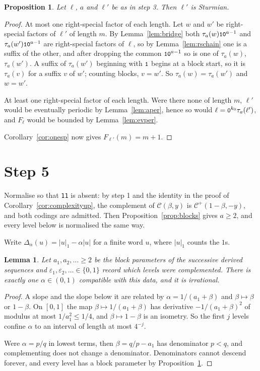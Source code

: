 \documentclass[11pt,a4paper]{article}
\newcommand{\seq}[1]{\texttt{\small #1}}
\newcommand{\C}{\mathcal{C}}
\newcommand{\Cp}{\mathcal{C}^{+}}
\theoremstyle{definition}
\theoremstyle{plain}
\newtheorem{lemma}[definition]{Lemma}
\newtheorem{proposition}[definition]{Proposition}
\begin{document}
\begin{proposition}\label{prop:derived}
Let $\ell$, $a$ and $\ell'$ be as in step 3. Then $\ell'$ is Sturmian.
\end{proposition}

\begin{proof}
At most one right-special factor of each length. Let $w$ and $w'$ be
right-special factors of $\ell'$ of length $m$. By Lemma~\ref{lem:bridge} both
$\tau_a(w)\seq{1}\seq{0}^{a-1}$ and $\tau_a(w')\seq{1}\seq{0}^{a-1}$ are
right-special factors of $\ell$, so by Lemma~\ref{lem:rschain} one is a suffix
of the other, and after dropping the common $\seq{1}\seq{0}^{a-1}$ so is one of
$\tau_a(w)$, $\tau_a(w')$. A suffix of $\tau_a(w')$ beginning with $\seq{1}$
begins at a block start, so it is $\tau_a(v)$ for a suffix $v$ of $w'$; counting
blocks, $v = w'$. So $\tau_a(w) = \tau_a(w')$ and $w = w'$.

At least one right-special factor of each length. Were there none of length $m$,
$\ell'$ would be eventually periodic by Lemma~\ref{lem:aper}, hence so would
$\ell = \seq{0}^{k_0}\tau_a(\ell')$, and $F_\ell$ would be bounded by
Lemma~\ref{lem:evper}.

Corollary~\ref{cor:onesp} now gives $F_{\ell'}(m) = m+1$.
\end{proof}

\section{Step 5}

Normalise so that \seq{11} is absent: by step 1 and the identity in the proof of
Corollary~\ref{cor:complexityup}, the complement of $\C(\beta,y)$ is
$\Cp(1-\beta,-y)$, and both codings are admitted. Then
Proposition~\ref{prop:blocks} gives $a \geq 2$, and every level below is
normalised the same way.

Write $\Delta_\alpha(u) = \lvert u\rvert_1 - \alpha\lvert u\rvert$ for a finite
word $u$, where $\lvert u \rvert_1$ counts the $1$s.

\begin{lemma}\label{lem:slope}
Let $a_1, a_2, \ldots \geq 2$ be the block parameters of the successive derived
sequences and $\varepsilon_1, \varepsilon_2, \ldots \in \{0,1\}$ record which
levels were complemented. There is exactly one $\alpha \in (0,1)$ compatible
with this data, and it is irrational.
\end{lemma}

\begin{proof}
A slope and the slope below it are related by $\alpha = 1/(a_1 + \beta)$ and
$\beta \mapsto \beta$ or $1-\beta$. On $[0,1]$ the map $\beta \mapsto
1/(a_1+\beta)$ has derivative $-1/(a_1+\beta)^2$ of modulus at most
$1/a_1^2 \leq 1/4$, and $\beta \mapsto 1 - \beta$ is an isometry. So the first
$j$ levels confine $\alpha$ to an interval of length at most $4^{-j}$.

Were $\alpha = p/q$ in lowest terms, then $\beta = q/p - a_1$ has denominator
$p < q$, and complementing does not change a denominator. Denominators cannot
descend forever, and every level has a block parameter by
Proposition~\ref{prop:derived}.
\end{proof}
\end{document}
